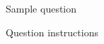 \documentclass[11pt]{exam}
\begin{document}
\begin{questions}

	\question Sample question


	\quad

	Question instructions

	\begin{framed}


	\end{framed}

\end{questions}
\end{document}
